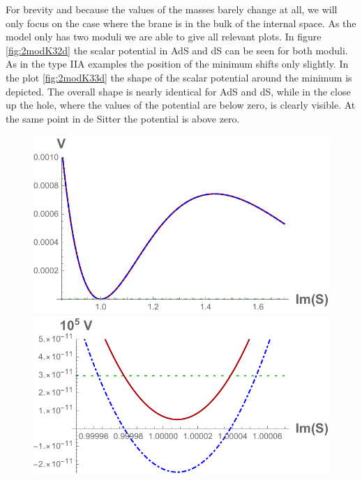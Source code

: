 \documentclass[12pt]{report}
\begin{document}
For brevity and because the values of the masses barely change at all, we will only focus on the case where the brane is in the bulk of the internal space. As the model only has two moduli we are able to give all relevant plots. In figure \ref{fig:2modK32d} the scalar potential in AdS and dS can be seen for both moduli. As in the type IIA examples the position of the minimum shifts only slightly. In the plot \ref{fig:2modK33d} the shape of the scalar potential around the minimum is depicted. The overall shape is nearly identical for AdS and dS, while in the close up the hole, where the values of the potential are below zero, is clearly visible. At the same point in de Sitter the potential is above zero.

\begin{figure}[htb]
\includegraphics[scale=0.52]{quevedo_314_S_large.pdf}\qquad\includegraphics[scale=0.58]{quevedo_314_S_close.pdf}

\end{figure}
\end{document}
